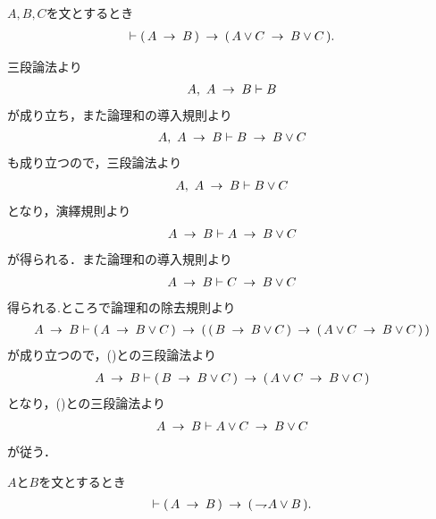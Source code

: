 	\begin{screen}
		\begin{logicalthm}[含意の論理和への遺伝性]
		\label{logicalthm:heredity_of_implication_to_disjunction}
			$A,B,C$を文とするとき
			\begin{align}
				\vdash (\, A \hspace{0.25em}\rightarrow\hspace{0.25em} B\, ) \hspace{0.25em}\rightarrow\hspace{0.25em} (\, A \vee C \hspace{0.25em}\rightarrow\hspace{0.25em} B \vee C\, ).
			\end{align}
		\end{logicalthm}
	\end{screen}
	
	\begin{sketch}
		三段論法より
		\begin{align}
			A,\ A \hspace{0.25em}\rightarrow\hspace{0.25em} B \vdash B
		\end{align}
		が成り立ち，また論理和の導入規則より
		\begin{align}
			A,\ A \hspace{0.25em}\rightarrow\hspace{0.25em} B \vdash B \hspace{0.25em}\rightarrow\hspace{0.25em} B \vee C
		\end{align}
		も成り立つので，三段論法より
		\begin{align}
			A,\ A \hspace{0.25em}\rightarrow\hspace{0.25em} B \vdash B \vee C
		\end{align}
		となり，演繹規則より
		\begin{align}
			A \rarrow B \vdash A \rarrow B \vee C
			\label{fom:heredity_of_implication_to_disjunction_1}
		\end{align}
		が得られる．また論理和の導入規則より
		\begin{align}
			A \rarrow B \vdash C \rarrow B \vee C
			\label{fom:heredity_of_implication_to_disjunction_2}
		\end{align}
		得られる.ところで論理和の除去規則より
		\begin{align}
			A \hspace{0.25em}\rightarrow\hspace{0.25em} B \vdash (\, A \hspace{0.25em}\rightarrow\hspace{0.25em} B \vee C\, )
			\hspace{0.25em}\rightarrow\hspace{0.25em} (\, (\, B \hspace{0.25em}\rightarrow\hspace{0.25em} B \vee C\, )
			\hspace{0.25em}\rightarrow\hspace{0.25em} (\, A \vee C \hspace{0.25em}\rightarrow\hspace{0.25em} B \vee C\, )\, )
		\end{align}
		が成り立つので，()との三段論法より
		\begin{align}
			A \hspace{0.25em}\rightarrow\hspace{0.25em} B \vdash (\, B \hspace{0.25em}\rightarrow\hspace{0.25em} B \vee C\, )
			\hspace{0.25em}\rightarrow\hspace{0.25em} (\, A \vee C \hspace{0.25em}\rightarrow\hspace{0.25em} B \vee C\, )
		\end{align}
		となり，()との三段論法より
		\begin{align}
			A \hspace{0.25em}\rightarrow\hspace{0.25em} B \vdash A \vee C \hspace{0.25em}\rightarrow\hspace{0.25em} B \vee C
		\end{align}
		が従う．
		\QED
	\end{sketch}
	
	\begin{screen}
		\begin{logicalthm}[含意は否定と論理和で表せる]
		\label{logicalthm:implication_rewritable_by_disjunction_of_negation}
			$A$と$B$を文とするとき
			\begin{align}
				\vdash (\, A \hspace{0.25em}\rightarrow\hspace{0.25em} B\, ) \hspace{0.25em}\rightarrow\hspace{0.25em} (\, \rightharpoondown\hspace{-0.25em} A \vee B\, ).
			\end{align}
		\end{logicalthm}
	\end{screen}
	
